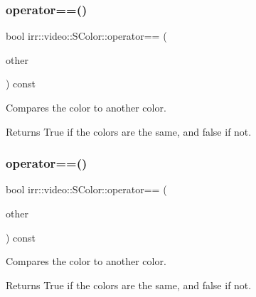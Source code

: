 \subsubsection{\texorpdfstring{operator==()}{operator==()}\hspace{0.1cm}{\footnotesize\ttfamily [1/2]}}
{\footnotesize\ttfamily bool irr\+::video\+::\+S\+Color\+::operator== (\begin{DoxyParamCaption}\item[{const \hyperlink{classirr_1_1video_1_1SColor}{S\+Color} \&}]{other }\end{DoxyParamCaption}) const\hspace{0.3cm}{\ttfamily [inline]}}



Compares the color to another color. 

\begin{DoxyReturn}{Returns}
True if the colors are the same, and false if not. 
\end{DoxyReturn}
\mbox{\label{classirr_1_1video_1_1SColor_a7042c0433d4b89e6473e9f123f6b35d0}} 
\subsubsection{\texorpdfstring{operator==()}{operator==()}\hspace{0.1cm}{\footnotesize\ttfamily [2/2]}}
{\footnotesize\ttfamily bool irr\+::video\+::\+S\+Color\+::operator== (\begin{DoxyParamCaption}\item[{const \hyperlink{classirr_1_1video_1_1SColor}{S\+Color} \&}]{other }\end{DoxyParamCaption}) const\hspace{0.3cm}{\ttfamily [inline]}}



Compares the color to another color. 

\begin{DoxyReturn}{Returns}
True if the colors are the same, and false if not. 
\end{DoxyReturn}
\mbox{\label{classirr_1_1video_1_1SColor_a8cf295c05c7406cc249843acbb31ec5f}} 
